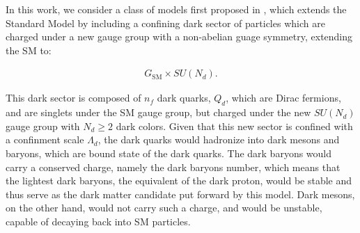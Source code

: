 %


In this work, we consider a class of models first proposed in \cite{schwallerEmergingJets2015}, which extends the Standard Model by including a confining dark sector of particles which are charged under a new gauge group with a non-abelian guage symmetry, extending the SM to:

\begin{equation}
	\begin{aligned}
		G_{\text{SM}} \times SU(N_d).
	\end{aligned}
\end{equation}

This dark sector is composed of $n_f$ dark quarks, $Q_d$, which are Dirac fermions, and are singlets under the SM gauge group, but charged under the new $SU(N_d)$ gauge group with $N_d \geq 2$ dark colors. Given that this new sector is confined with a confinment scale $\Lambda_d$, the dark quarks would hadronize into dark mesons and baryons, which are bound state of the dark quarks. The dark baryons would carry a conserved charge, namely the dark baryons number, which means that the lightest dark baryons, the equivalent of the dark proton, would be stable and thus serve as the dark matter candidate put forward by this model. Dark mesons, on the other hand, would not carry such a charge, and would be unstable, capable of decaying back into SM particles.

